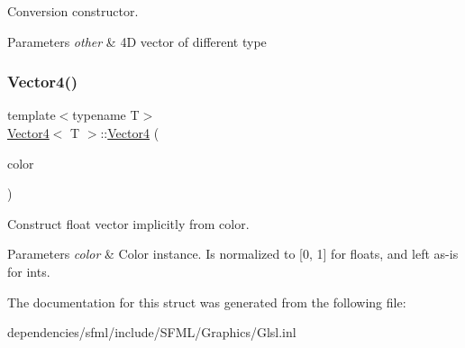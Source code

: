 Conversion constructor. 


\begin{DoxyParams}{Parameters}
{\em other} & 4D vector of different type \\
\hline
\end{DoxyParams}
\mbox{\label{struct_vector4_af1da65a743ddbb5c779b41eae766c00d}} 
\subsubsection{\texorpdfstring{Vector4()}{Vector4()}\hspace{0.1cm}{\footnotesize\ttfamily [3/3]}}
{\footnotesize\ttfamily template$<$typename T$>$ \\
\hyperlink{struct_vector4}{Vector4}$<$ T $>$\+::\hyperlink{struct_vector4}{Vector4} (\begin{DoxyParamCaption}\item[{const Color \&}]{color }\end{DoxyParamCaption})\hspace{0.3cm}{\ttfamily [inline]}}



Construct float vector implicitly from color. 


\begin{DoxyParams}{Parameters}
{\em color} & Color instance. Is normalized to \mbox{[}0, 1\mbox{]} for floats, and left as-\/is for ints. \\
\hline
\end{DoxyParams}


The documentation for this struct was generated from the following file\+:\begin{DoxyCompactItemize}
\item 
dependencies/sfml/include/\+S\+F\+M\+L/\+Graphics/Glsl.\+inl\end{DoxyCompactItemize}
